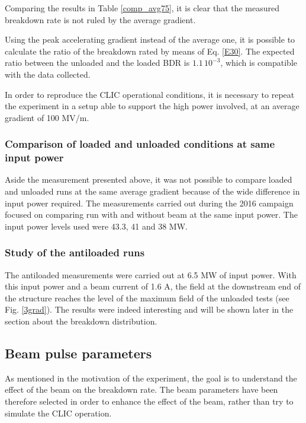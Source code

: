 Comparing the results in Table \ref{comp_avg75}, it is clear that the measured breakdown rate is not ruled by the average gradient.

Using the peak accelerating gradient instead of the average one, it is possible to calculate the ratio of the breakdown rated by means of Eq. \ref{E30}. The expected ratio between the unloaded and the loaded BDR is $1.1\,10^{-3}$, which is compatible with the data collected. 

In order to reproduce the CLIC operational conditions, it is necessary to repeat the experiment in a setup able to support the high power involved, at an average gradient of 100 MV/m.



\subsubsection{Comparison of loaded and unloaded conditions at same input power}

Aside the measurement presented above, it was not possible to compare loaded and unloaded runs at the same average gradient because of the wide difference in input power required. The measurements carried out during the 2016 campaign focused on comparing run with and without beam at the same input power.  The input power levels used were 43.3, 41 and 38 MW. 

\subsubsection{Study of the antiloaded runs}

The antiloaded measurements were carried out at 6.5 MW of input power. With this input power and a beam current of 1.6 A, the field at the downstream end of the structure reaches the level of the maximum field of the unloaded tests (see Fig. \ref{3grad}). The results were indeed interesting and will be shown later in the section about the breakdown distribution. 




\subsection[Beam pulse parameters]{Beam pulse parameters}

As mentioned in the motivation of the experiment, the goal is to understand the effect of the beam on the breakdown rate. The beam parameters have been therefore selected in order to enhance the effect of the beam, rather than try to simulate the CLIC operation. 

